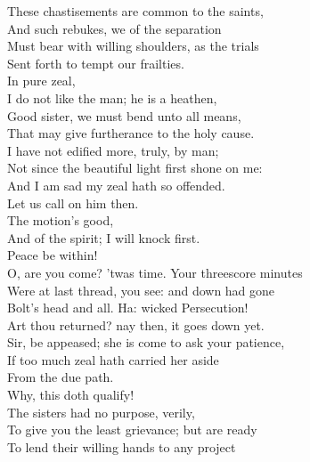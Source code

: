 \documentclass[a4paper,oneside,12pt]{memoir}
\begin{document}
\begin{drama*}
\tribulationspeaks These chastisements are common to the saints,\\
And such rebukes, we of the separation\\
Must bear with willing shoulders, as the trials\\
Sent forth to tempt our frailties.\\
\persecutionspeaks {} In pure zeal,\\
I do not like the man; he is a heathen,\\
\tribulationspeaks Good sister, we must bend unto all means,\\
That may give furtherance to the holy cause.\\
\persecutionspeaks I have not edified more, truly, by man;\\
Not since the beautiful light first shone on me:\\
And I am sad my zeal hath so offended.\\
\tribulationspeaks Let us call on him then.\\
\persecutionspeaks {} The motion's good,\\
And of the spirit; I will knock first.\\
 Peace be within!\\
\subtlespeaks O, are you come? 'twas time. Your threescore minutes\\
Were at last thread, you see: and down had gone\\
Bolt's head and all. Ha: wicked Persecution!\\
Art thou returned? nay then, it goes down yet.\\
\tribulationspeaks Sir, be appeased; she is come to ask your patience,\\
If too much zeal hath carried her aside\\
From the due path.\\
\subtlespeaks {} Why, this doth qualify!\\
\tribulationspeaks The sisters had no purpose, verily,\\
To give you the least grievance; but are ready\\
To lend their willing hands to any project\\

\end{drama*}
\end{document}
